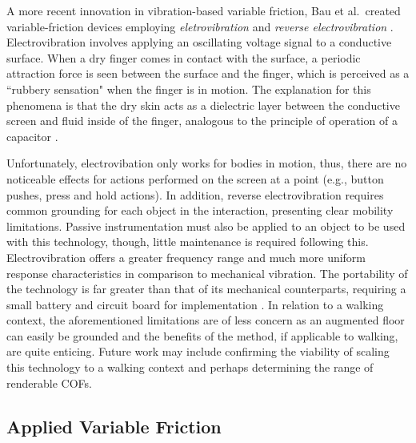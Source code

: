 \documentclass [12pt,letterpaper]{report}
\begin{document}
A more recent innovation in vibration-based variable friction, Bau et al.\ created variable-friction devices employing \textit{eletrovibration} \cite{bau2010teslatouch} and \textit{reverse electrovibration} \cite{bau2012revel}. Electrovibration involves applying an oscillating voltage signal to a conductive surface. When a dry finger comes in contact with the surface, a periodic attraction force is seen between the surface and the finger, which is perceived as a ``rubbery sensation" when the finger is in motion. The explanation for this phenomena is that the dry skin acts as a dielectric layer between the conductive screen and fluid inside of the finger, analogous to the principle of operation of a capacitor \cite{mallinckrodt1953perception}.

Unfortunately, electrovibation only works for bodies in motion, thus, there are no noticeable effects for actions performed on the screen at a point (e.g., button pushes, press and hold actions). In addition, reverse electrovibration requires common grounding for each object in the interaction, presenting clear mobility limitations. Passive instrumentation must also be applied to an object to be used with this technology, though, little maintenance is required following this. Electrovibration offers a greater frequency range and much more uniform response characteristics in comparison to mechanical vibration. The portability of the technology is far greater than that of its mechanical counterparts, requiring a small battery and circuit board for implementation \cite{bau2010teslatouch,bau2012revel}. In relation to a walking context, the aforementioned limitations are of less concern as an augmented floor can easily be grounded and the benefits of the method, if applicable to walking, are quite enticing. Future work may include confirming the viability of scaling this technology to a walking context and perhaps determining the range of renderable COFs.


\subsection{Applied Variable Friction}
\end{document}
